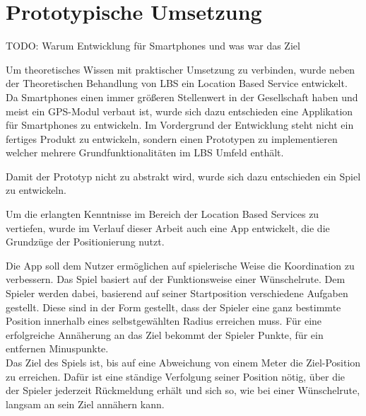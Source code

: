 \newpage
\section{Prototypische Umsetzung}
TODO: Warum Entwicklung für Smartphones und was war das Ziel

Um theoretisches Wissen mit praktischer Umsetzung zu verbinden, wurde neben der Theoretischen Behandlung von LBS ein Location Based Service entwickelt. Da Smartphones einen immer größeren Stellenwert in der Gesellschaft haben und meist ein GPS-Modul verbaut ist, wurde sich dazu entschieden eine Applikation für Smartphones zu entwickeln. Im Vordergrund der Entwicklung steht nicht ein fertiges Produkt zu entwickeln, sondern einen Prototypen zu implementieren welcher mehrere Grundfunktionalitäten im LBS Umfeld enthält.

Damit der Prototyp nicht zu abstrakt wird, wurde sich dazu entschieden ein Spiel zu entwickeln.



Um die erlangten Kenntnisse im Bereich der Location Based Services zu vertiefen, wurde im Verlauf dieser Arbeit auch eine App entwickelt, die die Grundzüge der Positionierung nutzt. 


Die App soll dem Nutzer ermöglichen auf spielerische Weise die Koordination zu verbessern. Das Spiel basiert auf der Funktionsweise einer Wünschelrute. Dem Spieler werden dabei, basierend auf seiner Startposition verschiedene Aufgaben gestellt. Diese sind in der Form gestellt, dass der Spieler eine ganz bestimmte Position innerhalb eines selbstgewählten Radius erreichen muss. Für eine erfolgreiche Annäherung an das Ziel bekommt der Spieler Punkte, für ein entfernen Minuspunkte.
\\
Das Ziel des Spiels ist, bis auf eine Abweichung von einem Meter die Ziel-Position zu erreichen. Dafür ist eine ständige Verfolgung seiner Position nötig, über die der Spieler jederzeit Rückmeldung erhält und sich so, wie bei einer Wünschelrute, langsam an sein Ziel annähern kann.









